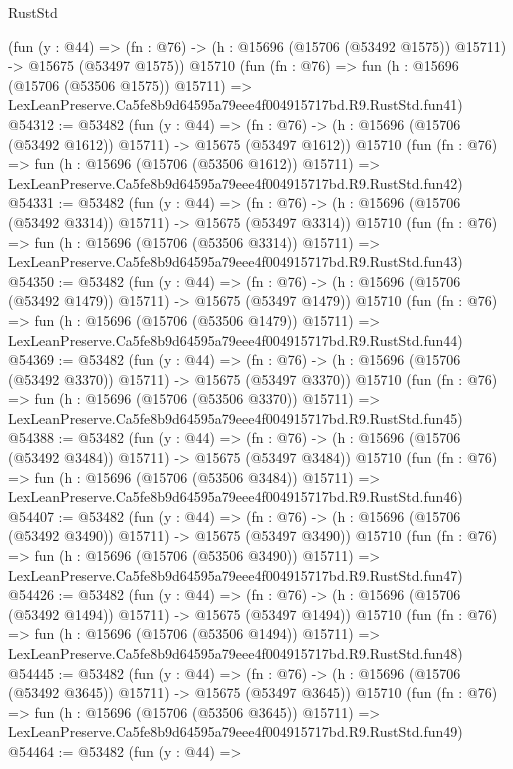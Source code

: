 \begin{lexlean}{RustStd}
\begin{coremodule}
    (fun (y : @44) =>
    (fn : @76) -> (h : @15696 (@15706 (@53492 @1575)) @15711) -> @15675 (@53497 @1575))
    @15710
    (fun (fn : @76) =>
    fun (h : @15696 (@15706 (@53506 @1575)) @15711) =>
    LexLeanPreserve.Ca5fe8b9d64595a79eee4f004915717bd.R9.RustStd.fun41)
@54312 := @53482
    (fun (y : @44) =>
    (fn : @76) -> (h : @15696 (@15706 (@53492 @1612)) @15711) -> @15675 (@53497 @1612))
    @15710
    (fun (fn : @76) =>
    fun (h : @15696 (@15706 (@53506 @1612)) @15711) =>
    LexLeanPreserve.Ca5fe8b9d64595a79eee4f004915717bd.R9.RustStd.fun42)
@54331 := @53482
    (fun (y : @44) =>
    (fn : @76) -> (h : @15696 (@15706 (@53492 @3314)) @15711) -> @15675 (@53497 @3314))
    @15710
    (fun (fn : @76) =>
    fun (h : @15696 (@15706 (@53506 @3314)) @15711) =>
    LexLeanPreserve.Ca5fe8b9d64595a79eee4f004915717bd.R9.RustStd.fun43)
@54350 := @53482
    (fun (y : @44) =>
    (fn : @76) -> (h : @15696 (@15706 (@53492 @1479)) @15711) -> @15675 (@53497 @1479))
    @15710
    (fun (fn : @76) =>
    fun (h : @15696 (@15706 (@53506 @1479)) @15711) =>
    LexLeanPreserve.Ca5fe8b9d64595a79eee4f004915717bd.R9.RustStd.fun44)
@54369 := @53482
    (fun (y : @44) =>
    (fn : @76) -> (h : @15696 (@15706 (@53492 @3370)) @15711) -> @15675 (@53497 @3370))
    @15710
    (fun (fn : @76) =>
    fun (h : @15696 (@15706 (@53506 @3370)) @15711) =>
    LexLeanPreserve.Ca5fe8b9d64595a79eee4f004915717bd.R9.RustStd.fun45)
@54388 := @53482
    (fun (y : @44) =>
    (fn : @76) -> (h : @15696 (@15706 (@53492 @3484)) @15711) -> @15675 (@53497 @3484))
    @15710
    (fun (fn : @76) =>
    fun (h : @15696 (@15706 (@53506 @3484)) @15711) =>
    LexLeanPreserve.Ca5fe8b9d64595a79eee4f004915717bd.R9.RustStd.fun46)
@54407 := @53482
    (fun (y : @44) =>
    (fn : @76) -> (h : @15696 (@15706 (@53492 @3490)) @15711) -> @15675 (@53497 @3490))
    @15710
    (fun (fn : @76) =>
    fun (h : @15696 (@15706 (@53506 @3490)) @15711) =>
    LexLeanPreserve.Ca5fe8b9d64595a79eee4f004915717bd.R9.RustStd.fun47)
@54426 := @53482
    (fun (y : @44) =>
    (fn : @76) -> (h : @15696 (@15706 (@53492 @1494)) @15711) -> @15675 (@53497 @1494))
    @15710
    (fun (fn : @76) =>
    fun (h : @15696 (@15706 (@53506 @1494)) @15711) =>
    LexLeanPreserve.Ca5fe8b9d64595a79eee4f004915717bd.R9.RustStd.fun48)
@54445 := @53482
    (fun (y : @44) =>
    (fn : @76) -> (h : @15696 (@15706 (@53492 @3645)) @15711) -> @15675 (@53497 @3645))
    @15710
    (fun (fn : @76) =>
    fun (h : @15696 (@15706 (@53506 @3645)) @15711) =>
    LexLeanPreserve.Ca5fe8b9d64595a79eee4f004915717bd.R9.RustStd.fun49)
@54464 := @53482
    (fun (y : @44) =>

\end{coremodule}
\end{lexlean}
